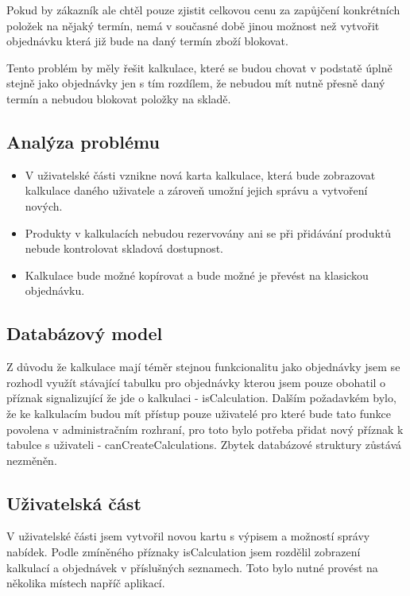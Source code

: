 Pokud by zákazník ale chtěl pouze zjistit celkovou cenu za zapůjčení konkrétních položek na nějaký termín, nemá v současné době jinou možnost než vytvořit objednávku která již bude na daný termín zboží blokovat.

Tento problém by měly řešit kalkulace, které se budou chovat v podstatě úplně stejně jako objednávky jen s tím rozdílem, že nebudou mít nutně přesně daný termín a nebudou blokovat položky na skladě.

\subsection{Analýza problému}

\begin{itemize}
    \item V uživatelské části vznikne nová karta kalkulace, která bude zobrazovat kalkulace daného uživatele a zároveň umožní jejich správu a vytvoření nových.
    \item Produkty v kalkulacích nebudou rezervovány ani se při přidávání produktů nebude kontrolovat skladová dostupnost.
    \item Kalkulace bude možné kopírovat a bude možné je převést na klasickou objednávku.
\end{itemize}

\subsection{Databázový model}

Z důvodu že kalkulace mají téměr stejnou funkcionalitu jako objednávky jsem se rozhodl využít stávající tabulku pro objednávky kterou jsem pouze obohatil o příznak signalizující že jde o kalkulaci - isCalculation. 
Dalším požadavkém bylo, že ke kalkulacím budou mít přístup pouze uživatelé pro které bude tato funkce povolena v administračním rozhraní, pro toto bylo potřeba přidat nový příznak k tabulce s uživateli - canCreateCalculations. Zbytek databázové struktury zůstává nezměněn. 

\subsection{Uživatelská část}

V uživatelské části jsem vytvořil novou kartu s výpisem a možností správy nabídek. Podle zmíněného příznaky isCalculation jsem rozdělil zobrazení kalkulací a objednávek v příslušných seznamech. Toto bylo nutné provést na několika místech napříč aplikací.

